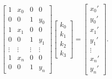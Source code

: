 \documentclass[11pt, letterpaper]{extarticle} %
\begin{document}
\begin{align}\label{eq:linear_distortion_model_matrix}
    \begin{bmatrix}
        1 & x_0 & 0 & 0 \\
        0 & 0 & 1 & y_0 \\
        1 & x_1 & 0 & 0 \\
        0 & 0 & 1 & y_1 \\
        \vdots & \vdots & \vdots & \vdots\\
        1 & x_n & 0 & 0 \\
        0 & 0 & 1 & y_n
    \end{bmatrix}
    \begin{bmatrix}
        k_0 \\ k_1 \\ k_2 \\ k_3
    \end{bmatrix}
    =
    \begin{bmatrix}
        x_0' \\ y_0' \\ x_1' \\ y_1' \\ \vdots \\ x_n' \\ y_n'
    \end{bmatrix}.
\end{align}
\end{document}
